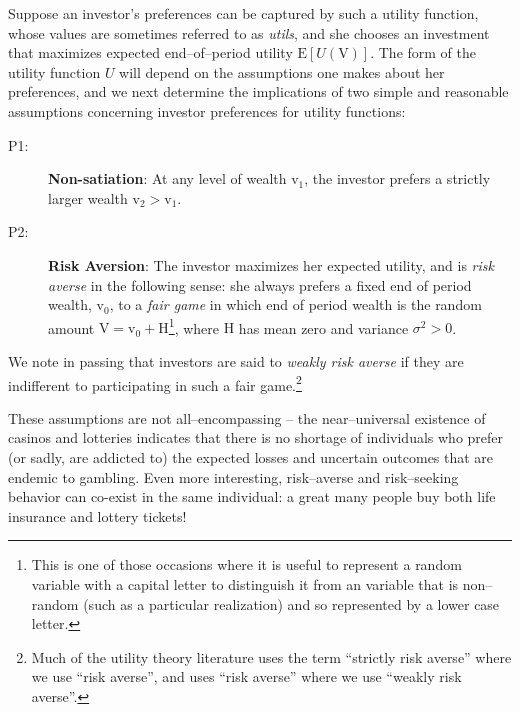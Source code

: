 \documentclass[graybox,envcountchap,sectrefs]{svmono}\usepackage[]{graphicx}\usepackage[]{xcolor}
\begin{document}
\begin{appendices}
Suppose an investor's preferences can be captured by such a utility
function, whose values are sometimes referred to as \emph{utils},
and she chooses an investment that maximizes expected end--of--period
utility $\mathrm{E}\left[U(\mathrm{V})\right]$. The form of the utility
function $U$ will depend on the assumptions one makes about her preferences,
and we next determine the implications of two simple and reasonable
assumptions concerning investor preferences for utility functions:
\begin{description}
\item [{P1:}] \textbf{Non-satiation}: At any level of wealth $\mathrm{v}_{1}$,
the investor prefers a strictly larger wealth $\mathrm{v}_{2}>\mathrm{v}_{1}$.
\item [{P2:}] \textbf{Risk Aversion}: The investor maximizes her expected
utility, and is\emph{ risk averse} in the following sense: she always
prefers a fixed end of period wealth, $\mathrm{v}_{0}$, to a \emph{fair
game} in which end of period wealth is the random amount $\mathrm{V}=\mathrm{v}_{0}+\text{H}$\footnote{This is one of those occasions where it is useful to represent a random
variable with a capital letter to distinguish it from an variable
that is non--random (such as a particular realization) and so represented
by a lower case letter.}, where $\mathrm{H}$ has mean zero and variance $\sigma^{2}>0$.
\end{description}
We note in passing that investors are said to \emph{weakly risk averse
}if they are indifferent to participating in such a fair game.\footnote{Much of the utility theory literature uses the term ``strictly risk
averse'' where we use ``risk averse'', and uses ``risk averse''
where we use ``weakly risk averse''.} 

These assumptions are not all--encompassing -- the near--universal
existence of casinos and lotteries indicates that there is no shortage
of individuals who prefer (or sadly, are addicted to) the expected
losses and uncertain outcomes that are endemic to gambling. Even more
interesting, risk--averse and risk--seeking behavior can co-exist
in the same individual: a great many people buy both life insurance
and lottery tickets!


\end{appendices}
\end{document}
